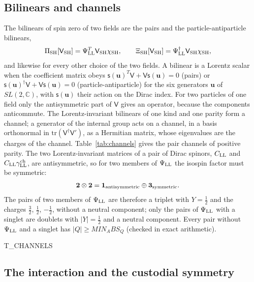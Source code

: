 \documentclass[aps,prd,onecolumn,superscriptaddress,nofootinbib,floatfix,longbibliography]{revtex4-2}
\newcommand{\LL}{{\rm LL}}
\newcommand{\SH}{{\rm SH}}
\newcommand{\tr}{\mathrm{tr}}
\begin{document}
\subsection{Bilinears and channels}

The bilinears of spin zero of two fields are the pairs and the particle-antiparticle bilinears,
\begin{equation}
\Pi_\SH[\mathsf V_\SH]=\Psi^T_\LL\mathsf V_\SH\chi_\SH,\qquad \Xi_\SH[\mathsf V_\SH]=\Psi^\dagger_\LL\mathsf V_\SH\chi_\SH ,
\label{eq:bilinears}
\end{equation}
and likewise for every other choice of the two fields. A bilinear is a Lorentz scalar when the coefficient matrix obeys
$\mathsf s(\mathbf u)^T\mathsf V+\mathsf V\mathsf s(\mathbf u)=0$ (pairs) or
$\mathsf s(\mathbf u)^\dagger\mathsf V+\mathsf V\mathsf s(\mathbf u)=0$ (particle-antiparticle) for the six generators
$\mathbf u$ of $SL(2,\mathbb C)$, with $\mathsf s(\mathbf u)$ their action on the Dirac index. For two particles of one field
only the antisymmetric part of $\mathsf V$ gives an operator, because the components anticommute. The Lorentz-invariant
bilinears of one kind and one parity form a channel; a generator of the internal group acts on a channel, in a basis
orthonormal in $\tr(\mathsf V^\dagger\mathsf V')$, as a Hermitian matrix, whose eigenvalues are the charges of the channel.
Table~\ref{tab:channels} gives the pair channels of positive parity. The two Lorentz-invariant matrices of a pair of Dirac
spinors, $C_\LL$ and $C_\LL\gamma^{\rm ch}_\LL$, are antisymmetric, so for two members of $\Psi_\LL$ the isospin factor must be
symmetric:
\begin{equation}
\mathbf 2\otimes\mathbf 2=\mathbf 1_{\rm antisymmetric}\oplus\mathbf 3_{\rm symmetric}.
\label{eq:2x2}
\end{equation}
The pairs of two members of $\Psi_\LL$ are therefore a triplet with $Y=\frac12$ and the charges $\frac32$, $\frac12$,
$-\frac12$, without a neutral component; only the pairs of $\Psi_\LL$ with a singlet are doublets with $|Y|=\frac12$ and a
neutral component. Every pair without $\Psi_\LL$ and a singlet has $|Q|\ge{{MIN_ABS_Q}}$ (checked in exact arithmetic).

{{T_CHANNELS}}

\subsection{The interaction and the custodial symmetry}
\end{document}
